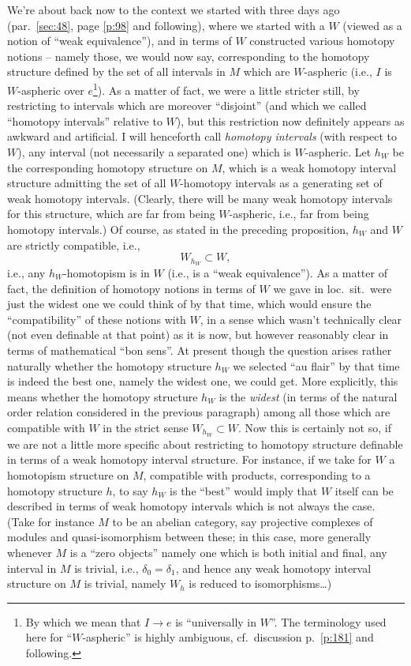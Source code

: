 We're about back now to the context we started with three days ago
(par.\ \ref{sec:48}, page \ref{p:98} and following), where we started
with a $W$ (viewed as a notion of ``weak equivalence''), and in terms
of $W$ constructed various homotopy notions -- namely those, we would
now say, corresponding to the homotopy structure defined by the set of
all intervals \bI{} in $M$ which are $W$-aspheric (i.e., $I$ is
$W$-aspheric over $e$\footnote{ By which we mean that $I\to e$ is
  ``universally in $W$''. The terminology used here for
  ``$W$-aspheric'' is highly ambiguous, cf.\ discussion p.\
  \ref{p:181} and following.}). As a matter of fact, we were a little
stricter still, by restricting to intervals which are moreover
``disjoint'' (and which we called ``homotopy intervals'' relative to
$W$), but this restriction now definitely appears as awkward and
artificial. I will henceforth call \emph{homotopy intervals} (with
respect to $W$), any interval (not necessarily a separated one) which
is $W$-aspheric. Let $h_W$ be the corresponding homotopy structure on
$M$, which is a weak homotopy interval structure admitting the set of
all $W$-homotopy intervals as a generating set of weak homotopy
intervals. (Clearly, there will be many weak homotopy intervals for
this structure, which are far from being $W$-aspheric, i.e., far from
being homotopy intervals.) Of course, as stated in the preceding
proposition, $h_W$ and $W$ are strictly compatible, i.e.,
\[W_{h_W} \subset W,\]
i.e., any $h_W$-homotopism is in $W$ (i.e., is a ``weak
equivalence''). As a matter of fact, the definition of homotopy
notions in terms of $W$ we gave in loc.\ sit.\ were just the widest
one we could think of by that time, which would ensure the
``compatibility'' of these notions with $W$, in a sense which wasn't
technically clear (not even definable at that point) as it is now, but
however reasonably clear in terms of mathematical ``bon sens''.
At present though the question arises rather naturally whether the
homotopy structure $h_W$ we selected ``au flair'' by that time is
indeed the best one, namely the widest one, we could get. More
explicitly, this means whether the homotopy structure $h_W$ is the
\emph{widest} (in terms of the natural order relation considered in
the previous paragraph) among all those which are compatible with $W$
in the strict sense $W_{h_W}\subset W$. Now this is certainly not so,
if we are not a little more specific about restricting to homotopy
structure definable in terms of a weak homotopy interval
structure. For instance, if we take for $W$ a homotopism structure on
$M$, compatible with products, corresponding to a homotopy structure
$h$, to say $h_W$ is the ``best'' would imply that $W$ itself can be
described in terms of weak homotopy intervals\pspage{133} which is not
always the case. (Take for instance $M$ to be an abelian category, say
projective complexes of modules and quasi-isomorphism between these;
in this case, more generally whenever $M$ is a ``zero objects'' namely
one which is both initial and final, any interval in $M$ is trivial,
i.e., $\delta_0=\delta_1$, and hence any weak homotopy interval
structure on $M$ is trivial, namely $W_h$ is reduced to
isomorphisms\ldots)

